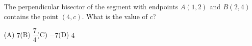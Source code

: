 The perpendicular bisector of the segment with endpoints $A(1,2)$ and $B(2,4)$ contains the point $(4,c)$. What is the value of $c$?

(A) $7$\qquad (B) $\dfrac{7}{4}$\qquad (C) $-7$\qquad (D) $4$
